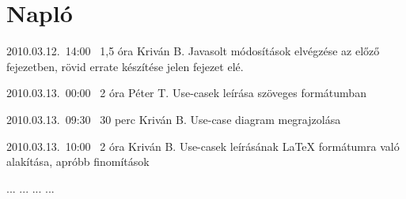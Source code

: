 %
\section{Napló}

\begin{naplo}

\bejegyzes
{2010.03.12.~14:00~}
{1,5 óra}
{Kriván B.}
{Javasolt módosítások elvégzése az előző fejezetben, rövid errate készítése jelen fejezet elé.}

\bejegyzes
{2010.03.13.~00:00~}
{2 óra}
{Péter T.}
{Use-casek leírása szöveges formátumban}

\bejegyzes
{2010.03.13.~09:30~}
{30 perc}
{Kriván B.}
{Use-case diagram megrajzolása}

\bejegyzes
{2010.03.13.~10:00~}
{2 óra}
{Kriván B.}
{Use-casek leírásának \LaTeX{} formátumra való alakítása, apróbb finomítások}

\bejegyzes
{...}
{...}
{...}
{...}


\end{naplo}

